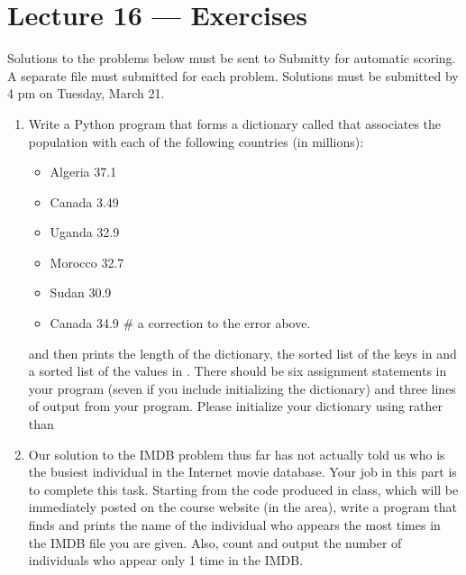 \documentclass[letterpaper,10pt,english]{sphinxmanual}
\begin{document}
\chapter{Lecture 16 — Exercises}
\label{\detokenize{lecture_notes/lec16_dictionaries1_exercises/exercises:lecture-16-exercises}}\label{\detokenize{lecture_notes/lec16_dictionaries1_exercises/exercises::doc}}
Solutions to the problems below must be sent to Submitty for
automatic scoring.  A separate file must submitted for each problem.
Solutions must be submitted by 4 pm on Tuesday, March 21.
\begin{enumerate}
\item {} 
Write a Python program that forms a dictionary called 
that associates the population with each of the following
countries (in millions):
\begin{itemize}
\item {} 
Algeria 37.1

\item {} 
Canada 3.49

\item {} 
Uganda 32.9

\item {} 
Morocco 32.7

\item {} 
Sudan 30.9

\item {} 
Canada 34.9   \# a correction to the error above.

\end{itemize}

and then prints the length of the  dictionary, the
sorted list of the keys in  and a sorted list of the
values in .  There should be six assignment statements
in your program (seven if you include initializing the dictionary)
and three lines of output from your program.
Please initialize your dictionary using  rather than \sphinxcode{\sphinxupquote{\{\}}}

\item {} 
Our solution to the IMDB problem thus far has not actually told us
who is the busiest individual in the Internet movie database.
Your job in this part is to complete this task.  Starting from the
code produced in class, which will be immediately posted on the
course website (in the  area), write a
program that finds and prints the name of the individual who
appears the most times in the IMDB file you are given.  Also, count
and output the number of individuals who appear only 1 time in the
IMDB.


\end{enumerate}
\end{document}
